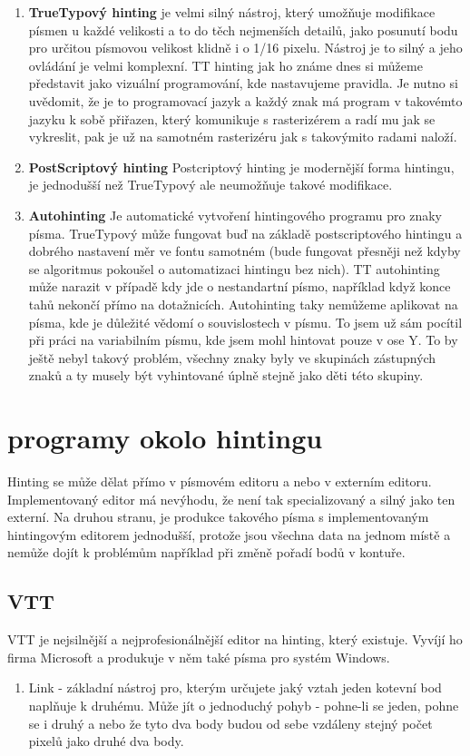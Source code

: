 \documentclass[a4paper]{article}
\begin{document}
\begin{enumerate}
\begin{enumerate}
\item \textbf{TrueTypový hinting}
je velmi silný nástroj, který umožňuje modifikace písmen u každé velikosti a to do těch nejmenších detailů, jako posunutí bodu pro určitou písmovou velikost klidně i o 1/16 pixelu. Nástroj je to silný a jeho ovládání je velmi komplexní. TT hinting jak ho známe dnes si můžeme představit jako vizuální programování, kde nastavujeme pravidla. Je nutno si uvědomit, že je to programovací jazyk a každý znak má program v takovémto jazyku k sobě přiřazen, který komunikuje s rasterizérem a radí mu jak se vykreslit, pak je už na samotném rasterizéru jak s takovýmito radami naloží.

\item \textbf{PostScriptový hinting}
Postcriptový hinting je modernější forma hintingu, je jednodušší než TrueTypový ale neumožňuje takové modifikace.

\item \textbf{Autohinting}
Je automatické vytvoření hintingového programu pro znaky písma. TrueTypový může fungovat buď na základě postscriptového hintingu a dobrého nastavení měr ve fontu samotném (bude fungovat přesněji než kdyby se algoritmus pokoušel o automatizaci hintingu bez nich). TT autohinting může narazit v případě kdy jde o nestandartní písmo, například když konce tahů nekončí přímo na dotažnicích. Autohinting taky nemůžeme aplikovat na písma, kde je důležité vědomí o souvislostech v písmu. To jsem už sám pocítil při práci na variabilním písmu, kde jsem mohl hintovat pouze v ose Y. To by ještě nebyl takový problém, všechny znaky byly ve skupinách zástupných znaků a ty musely být vyhintované úplně stejně jako děti této skupiny.
\end{enumerate}

\section{programy okolo hintingu}
Hinting se může dělat přímo v písmovém editoru a nebo v externím editoru. Implementovaný editor má nevýhodu, že není tak specializovaný a silný jako ten externí. Na druhou stranu, je produkce takového písma s implementovaným hintingovým editorem jednodušší, protože jsou všechna data na jednom místě a nemůže dojít k problémům například při změně pořadí bodů v kontuře.

\subsection{VTT}
VTT je nejsilnější a nejprofesionálnější editor na hinting, který existuje. Vyvíjí ho firma Microsoft a produkuje v něm také písma pro systém Windows.
\begin{enumerate}
\item Link - základní nástroj pro, kterým určujete jaký vztah jeden kotevní bod naplňuje k druhému. Může jít o jednoduchý pohyb - pohne-li se jeden, pohne se i druhý a nebo že tyto dva body budou od sebe vzdáleny stejný počet pixelů jako druhé dva body.


\end{enumerate}
\end{enumerate}
\end{document}
